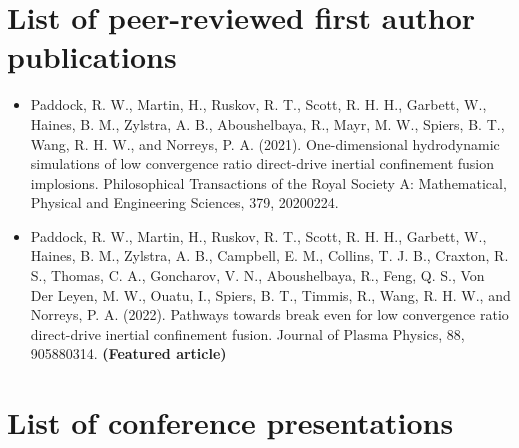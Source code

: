 \section{List of peer-reviewed first author publications}

\begin{itemize}
	\item Paddock, R. W., Martin, H., Ruskov, R. T., Scott, R. H. H., Garbett, W., Haines, B. M., Zylstra, A. B., Aboushelbaya, R., Mayr, M. W., Spiers, B. T., Wang, R. H. W., and Norreys, P. A. (2021). One-dimensional hydrodynamic simulations of low convergence ratio direct-drive inertial confinement fusion implosions. Philosophical Transactions of the Royal Society A: Mathematical, Physical and Engineering Sciences, 379, 20200224.
	\item Paddock, R. W., Martin, H., Ruskov, R. T., Scott, R. H. H., Garbett, W., Haines, B. M., Zylstra, A. B., Campbell, E. M., Collins, T. J. B., Craxton, R. S., Thomas, C. A., Goncharov, V. N., Aboushelbaya, R., Feng, Q. S., Von Der Leyen, M. W., Ouatu, I., Spiers, B. T., Timmis, R., Wang, R. H. W., and Norreys, P. A. (2022). Pathways towards break even for low convergence ratio direct-drive inertial confinement fusion. Journal of Plasma Physics, 88, 905880314. \textbf{(Featured article)}
\end{itemize}

\section{List of conference presentations}

